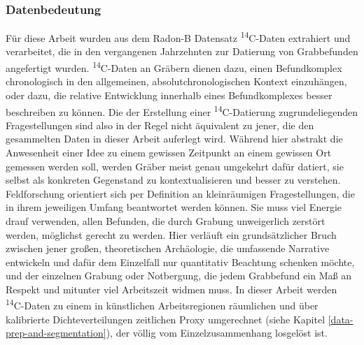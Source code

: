 \documentclass[openany,twoside,twocolumn]{book}
\begin{document}
\hypertarget{datenbedeutung}{%
\subsubsection{Datenbedeutung}\label{datenbedeutung}}

Für diese Arbeit wurden aus dem Radon-B Datensatz \textsuperscript{14}C-Daten extrahiert und verarbeitet, die in den vergangenen Jahrzehnten zur Datierung von Grabbefunden angefertigt wurden. \textsuperscript{14}C-Daten an Gräbern dienen dazu, einen Befundkomplex chronologisch in den allgemeinen, absolutchronologischen Kontext einzuhängen, oder dazu, die relative Entwicklung innerhalb eines Befundkomplexes besser beschreiben zu können. Die der Erstellung einer \textsuperscript{14}C-Datierung zugrundeliegenden Fragestellungen sind also in der Regel nicht äquivalent zu jener, die den gesammelten Daten in dieser Arbeit auferlegt wird. Während hier abstrakt die Anwesenheit einer Idee zu einem gewissen Zeitpunkt an einem gewissen Ort gemessen werden soll, werden Gräber meist genau umgekehrt dafür datiert, sie selbst als konkreten Gegenstand zu kontextualisieren und besser zu verstehen. Feldforschung orientiert sich per Definition an kleinräumigen Fragestellungen, die in ihrem jeweiligen Umfang beantwortet werden können. Sie muss viel Energie drauf verwenden, allen Befunden, die durch Grabung unweigerlich zerstört werden, möglichst gerecht zu werden. Hier verläuft ein grundsätzlicher Bruch zwischen jener großen, theoretischen Archäologie, die umfassende Narrative entwickeln und dafür dem Einzelfall nur quantitativ Beachtung schenken möchte, und der einzelnen Grabung oder Notbergung, die jedem Grabbefund ein Maß an Respekt und mitunter viel Arbeitszeit widmen muss. In dieser Arbeit werden \textsuperscript{14}C-Daten zu einem in künstlichen Arbeitsregionen räumlichen und über kalibrierte Dichteverteilungen zeitlichen Proxy umgerechnet (siehe Kapitel \ref{data-prep-and-segmentation}), der völlig vom Einzelzusammenhang losgelöst ist.
\end{document}
